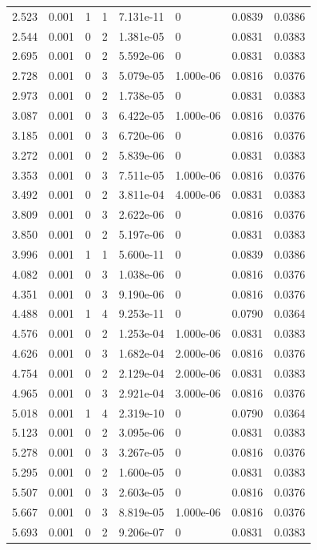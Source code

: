 \documentclass[preview]{standalone}
\begin{document}
{{\begin{tabular}{L{1.2cm}C{1.2cm} C{0.3cm}C{0.5cm} C{1.4cm}C{1.4cm} C{1.4cm}C{1.4cm}}
  2.523  &  0.001  & 1     &  1 &  7.131e-11  & 0  & 0.0839 &  0.0386   \\ 
  2.544  &  0.001  & 0     &  2 &  1.381e-05  & 0  & 0.0831 &  0.0383   \\ 
  2.695  &  0.001  & 0     &  2 &  5.592e-06  & 0  & 0.0831 &  0.0383   \\ 
  2.728  &  0.001  & 0     &  3 &  5.079e-05  & 1.000e-06  & 0.0816 &  0.0376   \\ 
  2.973  &  0.001  & 0     &  2 &  1.738e-05  & 0  & 0.0831 &  0.0383   \\ 
  3.087  &  0.001  & 0     &  3 &  6.422e-05  & 1.000e-06  & 0.0816 &  0.0376   \\ 
  3.185  &  0.001  & 0     &  3 &  6.720e-06  & 0  & 0.0816 &  0.0376   \\ 
  3.272  &  0.001  & 0     &  2 &  5.839e-06  & 0  & 0.0831 &  0.0383   \\ 
  3.353  &  0.001  & 0     &  3 &  7.511e-05  & 1.000e-06  & 0.0816 &  0.0376   \\ 
  3.492  &  0.001  & 0     &  2 &  3.811e-04  & 4.000e-06  & 0.0831 &  0.0383   \\ 
  3.809  &  0.001  & 0     &  3 &  2.622e-06  & 0  & 0.0816 &  0.0376   \\ 
  3.850  &  0.001  & 0     &  2 &  5.197e-06  & 0  & 0.0831 &  0.0383   \\ 
  3.996  &  0.001  & 1     &  1 &  5.600e-11  & 0  & 0.0839 &  0.0386   \\ 
  4.082  &  0.001  & 0     &  3 &  1.038e-06  & 0  & 0.0816 &  0.0376   \\ 
  4.351  &  0.001  & 0     &  3 &  9.190e-06  & 0  & 0.0816 &  0.0376   \\ 
  4.488  &  0.001  & 1     &  4 &  9.253e-11  & 0  & 0.0790 &  0.0364   \\ 
  4.576  &  0.001  & 0     &  2 &  1.253e-04  & 1.000e-06  & 0.0831 &  0.0383   \\ 
  4.626  &  0.001  & 0     &  3 &  1.682e-04  & 2.000e-06  & 0.0816 &  0.0376   \\ 
  4.754  &  0.001  & 0     &  2 &  2.129e-04  & 2.000e-06  & 0.0831 &  0.0383   \\ 
  4.965  &  0.001  & 0     &  3 &  2.921e-04  & 3.000e-06  & 0.0816 &  0.0376   \\ 
  5.018  &  0.001  & 1     &  4 &  2.319e-10  & 0  & 0.0790 &  0.0364   \\ 
  5.123  &  0.001  & 0     &  2 &  3.095e-06  & 0  & 0.0831 &  0.0383   \\ 
  5.278  &  0.001  & 0     &  3 &  3.267e-05  & 0  & 0.0816 &  0.0376   \\ 
  5.295  &  0.001  & 0     &  2 &  1.600e-05  & 0  & 0.0831 &  0.0383   \\ 
  5.507  &  0.001  & 0     &  3 &  2.603e-05  & 0  & 0.0816 &  0.0376   \\ 
  5.667  &  0.001  & 0     &  3 &  8.819e-05  & 1.000e-06  & 0.0816 &  0.0376   \\ 
  5.693  &  0.001  & 0     &  2 &  9.206e-07  & 0  & 0.0831 &  0.0383   \\ 
\hline 
\end{tabular} 

}}
\end{document}
